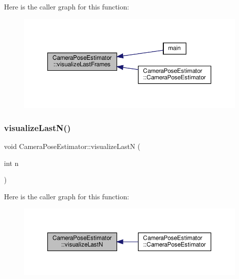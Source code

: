 Here is the caller graph for this function\+:\nopagebreak
\begin{figure}[H]
\begin{center}
\leavevmode
\includegraphics[width=350pt]{classCameraPoseEstimator_a8d19513e75924b7e3e56e79a97c534a5_icgraph}
\end{center}
\end{figure}
\mbox{\label{classCameraPoseEstimator_af77110f690dea3934f419858cd89fb3b}} 
\subsubsection{\texorpdfstring{visualize\+Last\+N()}{visualizeLastN()}}
{\footnotesize\ttfamily void Camera\+Pose\+Estimator\+::visualize\+LastN (\begin{DoxyParamCaption}\item[{int}]{n }\end{DoxyParamCaption})}

Here is the caller graph for this function\+:\nopagebreak
\begin{figure}[H]
\begin{center}
\leavevmode
\includegraphics[width=350pt]{classCameraPoseEstimator_af77110f690dea3934f419858cd89fb3b_icgraph}
\end{center}
\end{figure}



